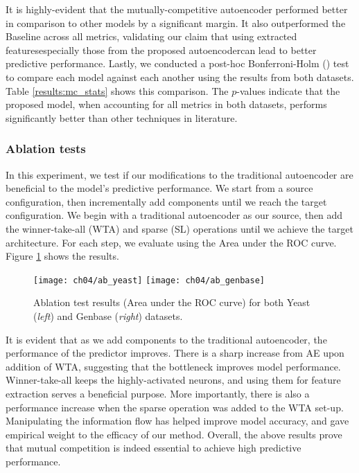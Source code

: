 


\par It is highly-evident that the mutually-competitive autoencoder performed
better in comparison to other models by a significant margin. It also
outperformed the Baseline across all metrics, validating our claim that using
extracted features\textemdash especially those from the proposed
autoencoder\textemdash can lead to better predictive performance. Lastly, we
conducted a post-hoc Bonferroni-Holm (\cite{holm1979simple}) test to compare
each model against each another using the results from both datasets. Table
\ref{results:mc_stats} shows this comparison. The $p$-values indicate that the
proposed model, when accounting for all metrics in both datasets, performs
significantly better than other techniques in literature.



\subsubsection{Ablation tests}

\par In this experiment, we test if our modifications to the traditional
autoencoder are beneficial to the model's predictive performance.  We start
from a source configuration, then incrementally add components until we reach
the target configuration. We begin with a traditional autoencoder as our
source, then add the winner-take-all (WTA) and sparse (SL) operations until we
achieve the target architecture. For each step, we evaluate using the Area
under the ROC curve. Figure \ref{results:mc_ablation} shows the results.

\begin{figure}[t]
  \centering
  \texttt{[image: ch04/ab\_yeast]}
  \texttt{[image: ch04/ab\_genbase]}
  \caption[Ablation test results for the two protein benchmarks]{
    Ablation test results (Area under the ROC curve)
    for both Yeast (\textit{left}) and Genbase (\textit{right}) datasets.
  }
  \label{results:mc_ablation}
\end{figure}

\par It is evident that as we add components to the traditional autoencoder,
the performance of the predictor improves. There is a sharp increase from AE
upon addition of WTA, suggesting that the bottleneck improves model
performance. Winner-take-all keeps the highly-activated neurons, and using them
for feature extraction serves a beneficial purpose. More importantly, there is
also a performance increase when the sparse operation was added to the WTA
set-up. Manipulating the information flow has helped improve model accuracy,
and gave empirical weight to the efficacy of our method. Overall, the above
results prove that mutual competition is indeed essential to achieve high
predictive performance.

